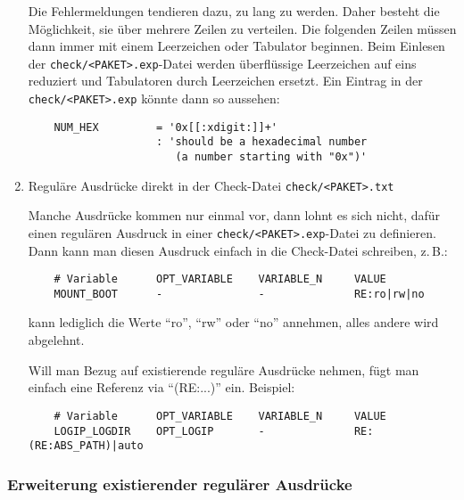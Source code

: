 \begin{enumerate}
Die Fehlermeldungen tendieren dazu, zu lang zu werden. Daher besteht
die Möglichkeit, sie über mehrere Zeilen zu verteilen. Die folgenden
Zeilen müssen dann immer mit einem Leerzeichen oder Tabulator
beginnen. Beim Einlesen der \texttt{check/<PAKET>.exp}-Datei werden überflüssige
Leerzeichen auf eins reduziert und Tabulatoren durch Leerzeichen
ersetzt. Ein Eintrag in der \texttt{check/<PAKET>.exp} könnte dann so aussehen:

\begin{example}
\begin{verbatim}
    NUM_HEX         = '0x[[:xdigit:]]+'
                    : 'should be a hexadecimal number
                       (a number starting with "0x")'
\end{verbatim}
\end{example}

\item  Reguläre Ausdrücke direkt in der Check-Datei \texttt{check/<PAKET>.txt}

Manche Ausdrücke kommen nur einmal vor, dann lohnt es sich nicht,
dafür einen regulären Ausdruck in einer \texttt{check/<PAKET>.exp}-Datei zu definieren. Dann kann man
diesen Ausdruck einfach in die Check-Datei schreiben, z.\,B.:

\begin{example}
\begin{verbatim}
    # Variable      OPT_VARIABLE    VARIABLE_N     VALUE
    MOUNT_BOOT      -               -              RE:ro|rw|no
\end{verbatim}
\end{example}

 kann lediglich die Werte "`ro"', "`rw"' oder "`no"' annehmen,
alles andere wird abgelehnt.

Will man Bezug auf existierende reguläre Ausdrücke nehmen, fügt man
einfach eine Referenz via "`(RE:...)"' ein. Beispiel:

\begin{example}
\begin{verbatim}
    # Variable      OPT_VARIABLE    VARIABLE_N     VALUE
    LOGIP_LOGDIR    OPT_LOGIP       -              RE:(RE:ABS_PATH)|auto
\end{verbatim}
\end{example}

\end{enumerate}


\subsubsection{Erweiterung existierender regulärer Ausdrücke}

